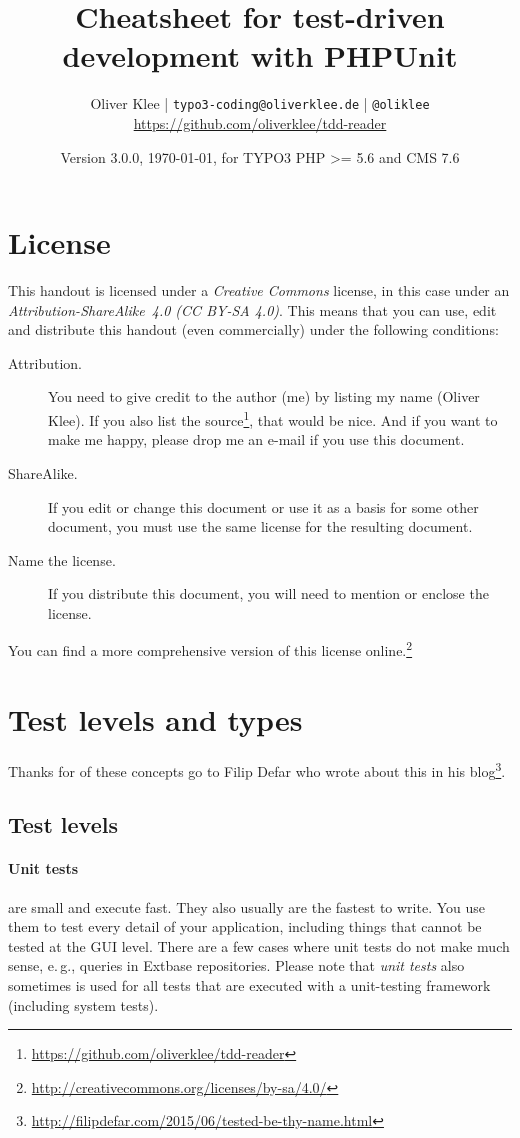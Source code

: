 \documentclass[a4paper,11pt,headsepline]{scrartcl}
\author{
  Oliver Klee | \texttt{typo3-coding@oliverklee.de} | \texttt{@oliklee} \\
  \url{https://github.com/oliverklee/tdd-reader}
}
\date{Version 3.0.0, \today, for TYPO3 PHP >= 5.6 and CMS 7.6}
\title{
  Cheatsheet for test-driven development with PHPUnit
}
\begin{document}
\maketitle

\section*{License}

This handout is licensed under a \emph{Creative Commons} license, in this case under an \emph{Attribution-ShareAlike~4.0 (CC BY-SA 4.0)}. This means that you can use, edit and distribute this handout (even commercially) under the following conditions:

\begin{description}
  \item[Attribution.] You need to give credit to the author (me) by listing my name (Oliver Klee). If you also list the source\footnote{\url{https://github.com/oliverklee/tdd-reader}}, that would be nice. And if you want to make me happy, please drop me an e-mail if you use this document.
  \item[ShareAlike.] If you edit or change this document or use it as a basis for some other document, you must use the same license for the resulting document.
  \item[Name the license.] If you distribute this document, you will need to mention or enclose the license.
\end{description}

You can find a more comprehensive version of this license online.\footnote{\url{http://creativecommons.org/licenses/by-sa/4.0/}}


\pagebreak
\tableofcontents

\pagebreak
\section{Test levels and types}

Thanks for of these concepts go to Filip Defar who wrote about this in his blog\footnote{\url{http://filipdefar.com/2015/06/tested-be-thy-name.html}}.


\subsection{Test levels}

\paragraph{Unit tests} are small and execute fast. They also usually are the fastest to write. You use them to test every detail of your application, including things that cannot be tested at the GUI level. There are a few cases where unit tests do not make much sense, e.\,g., queries in Extbase repositories. Please note that \emph{unit tests} also sometimes is used for all tests that are executed with a unit-testing framework (including system tests).
\end{document}
